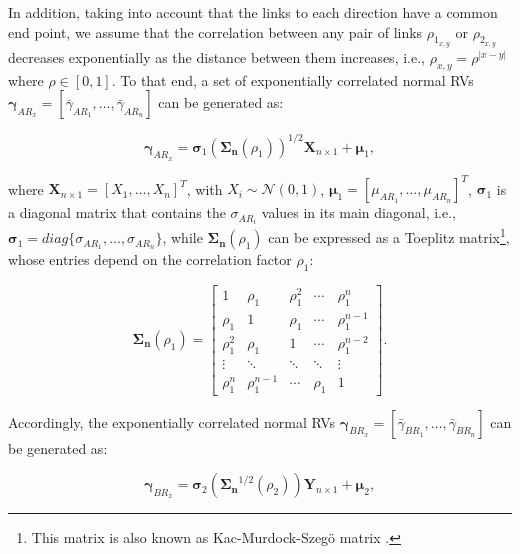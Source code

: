 \documentclass[12pt,draftcls, onecolumn]{IEEEtran}
\begin{document}
In addition, taking into account that the links to each direction have a common end point, we assume that the correlation between any pair of links $\rho_{1_{x,y}}$ or $\rho_{2_{x,y}}$  decreases exponentially as the distance between them increases, i.e., $\rho_{x,y} = \rho^{\left|x-y\right|}$ where $\rho \in [0,1]$\cite{104090}. To that end, a set of exponentially correlated normal RVs $\boldsymbol{\gamma}_{AR_{x}}=\left[\bar{\gamma}_{AR_{1}}, \ldots, \bar{\gamma}_{AR_{n}}\right]$ can be generated as:

\begingroup
\begin{equation}
\boldsymbol{\gamma}_{AR_{x}} = \mathbf{\sigma}_1 \left(\mathbf{\Sigma_n}\left(\rho_1\right)\right)^{1/2}\textbf{X}_{n\times 1}+\mathbf{\mu}_1, \label{eq1}
\end{equation}
\endgroup

\noindent where $\textbf{X}_{n\times 1} = \left[X_1,\ldots,X_n\right]^T$, with $X_i\sim \mathcal{N}(0,1)$, $\mathbf{\mu}_1 = \left[\mu_{AR_{1}},\ldots,\mu_{AR_{n}}\right]^T$, $\mathbf{\sigma}_1$ is a diagonal matrix that contains the $\sigma_{AR_{i}}$ values in its main diagonal, i.e., $\mathbf{\sigma}_1 = diag\{\sigma_{AR_{1}},\ldots,\sigma_{AR_{n}}\}$, while $\mathbf{\Sigma_n}\left(\rho_1\right)$ can be expressed as a Toeplitz matrix\footnote{This matrix is also known as Kac-Murdock-Szeg\"{o} matrix \cite{toeplitz}.}, whose entries depend on the correlation factor $\rho_1$:

\begingroup
\begin{equation}
\mathbf{\Sigma_n}\left(\rho_1\right) = \left[\begin{array}{ccccc}
1&\rho_1&\rho_1^2&\cdots&\rho_1^n\\
\rho_1&1&\rho_1&\cdots&\rho_1^{n-1}\\
\rho_1^2&\rho_1&1&\cdots&\rho_1^{n-2}\\
\vdots&\ddots&\ddots&\ddots&\vdots\\
\rho_1^n&\rho_1^{n-1}&\cdots&\rho_1&1
\end{array}\right].
\end{equation}
\endgroup

\noindent Accordingly, the exponentially correlated normal RVs $\boldsymbol{\gamma}_{BR_{x}}=\left[\bar{\gamma}_{BR_{1}}, \ldots, \bar{\gamma}_{BR_{n}}\right]$ can be generated as:


\begingroup
\begin{equation}
\boldsymbol{\gamma}_{BR_{x}} = \mathbf{\sigma}_2 \left(\mathbf{\Sigma_n}^{1/2}\left(\rho_2\right)\right)\textbf{Y}_{n\times 1}+\mathbf{\mu}_2, \label{eq2}
\end{equation}
\endgroup
\end{document}
